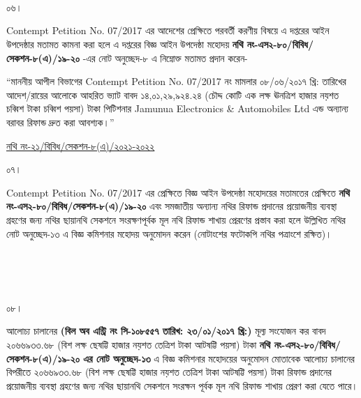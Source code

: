 \documentclass[12pt]{article}
\newcommand{\fileno}{নথি নং-২১/বিবিধ/সেকশন-৮(এ)/২০২১-২০২২}
\newcommand{\tvat}{১৪,০১,২৯,৯২৪.২৪ (চৌদ্দ কোটি এক লক্ষ ঊনত্রিশ হাজার নয়শত চব্বিশ টাকা চব্বিশ পয়সা) টাকা}
\newcommand{\vat}{২০৬৬৯৩৩.৬৮ (বিশ লক্ষ ছেষট্টি হাজার নয়শত তেত্রিশ টাকা আটষট্টি পয়সা) টাকা}
\newcommand{\cno}{১০৮৫৫৭}
\newcommand{\dt}{২৩/০১/২০১৭}
\begin{document}
\\
\\
\\
\begin{minipage}[t]{0.05\linewidth}
০৬।
\end{minipage}
\begin{minipage}[t]{1\linewidth}
Contempt Petition No. 07/2017
এর আদেশের প্রেক্ষিতে পরবর্তী
করণীয় বিষয়ে এ দপ্তরের আইন
উপদেষ্ঠার মতামত কামনা করা হলে এ দপ্তরের
বিজ্ঞ আইন উপদেষ্ঠা মহোদয়
\textbf{নথি নং-এস২-৮০/বিবিধ/সেকশন-৮(এ)/১৯-২০}
-এর নোট অনুচ্ছেদ-৮ এ নিম্নোক্ত মতামত প্রদান করেন-


\hspace{1em}``মাননীয় আপীল বিভাগের
Contempt Petition No. 07/2017
নং মামলার ০৮/০৬/২০১৭ খ্রি: তারিখের
আদেশ/রায়ের আলোকে আহরিত ভ্যাট বাবদ
{\tvat} পিটিশনার
Jamunua Electronics \& Automobiles Ltd
এন্ড অন্যান্য বরাবর রিফান্ড
দ্রুত করা আবশ্যক।''
\end{minipage}
\newpage
\begin{minipage}[t]{0.59\linewidth}
\hspace{0.5em}
\end{minipage}
\begin{minipage}[t]{1\textwidth}
\underline{{\fileno}}
\end{minipage}
\begin{minipage}[t]{0.05\linewidth}
০৭।
\end{minipage}
\begin{minipage}[t]{1\linewidth}
Contempt Petition No. 07/2017
এর প্রেক্ষিতে বিজ্ঞ আইন উপদেষ্ঠা মহোদয়ের
মতামতের প্রেক্ষিতে
\textbf{নথি নং-এস২-৮০/বিবিধ/সেকশন-৮(এ)/১৯-২০}
এবং সমজাতীয় অন্যান্য নথির
রিফান্ড প্রদানের প্রয়োজনীয় ব্যবস্থা গ্রহণের
জন্য নথির ছায়ানথি সেকশনে
সংরক্ষণপূর্বক মূল নথি রিফান্ড
শাখায় প্রেরণের প্রস্তাব করা হলে উল্লিখিত নথির
নোট অনুচ্ছেদ-১৩ এ বিজ্ঞ কমিশনার মহোদয় অনুমোদন
করেন (নোটাংশের ফটোকপি নথির পত্রাংশে রক্ষিত)।
\end{minipage}
\\
\\
\\
\begin{minipage}[t]{0.05\linewidth}
০৮।
\end{minipage}
\begin{minipage}[t]{1\linewidth}
আলোচ্য চালানের
\textbf{(বিল অব এন্ট্রি নং সি-{\cno} তারিখ: {\dt} খ্রি:)} মূল্য সংযোজন কর বাবদ
{\vat} \textbf{নথি নং-এস২-৮০/বিবিধ/সেকশন-৮(এ)/১৯-২০
এর নোট অনুচ্ছেদ-১৩} এ বিজ্ঞ কমিশনার মহোদয়ের
অনুমোদন মোতাবেক আলোচ্য চালানের
বিপরীতে
{\vat} রিফান্ড প্রদানের প্রয়োজনীয় ব্যবস্থা গ্রহণের জন্য
নথির ছায়ানথি সেকশনে সংরক্ষন পূর্বক
মূল নথি রিফান্ড শাখায় প্রেরণ করা যেতে পারে।
\end{minipage}



\thispagestyle{laststyle}
\end{document}
